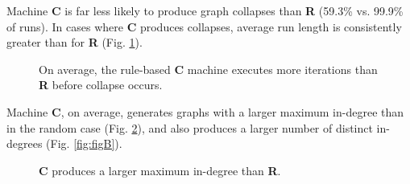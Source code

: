 \documentclass[twoside,twocolumn]{article}
\begin{document}
Machine \textbf{C} is far less likely to produce graph collapses than
\textbf{R} (59.3\% vs. 99.9\% of runs). In cases where \textbf{C} produces
collapses, average run length is consistently greater than
for \textbf{R} (Fig. \ref{fig:figA}).

\begin{figure}
  \caption{On average, the rule-based \textbf{C} machine executes more iterations than \textbf{R}  before collapse occurs.}
  \label{fig:figA}
\end{figure}

Machine \textbf{C}, on average, generates graphs with a larger 
maximum in-degree than in the random case (Fig. \ref{fig:figC}), and also produces a
larger number of distinct in-degrees (Fig. \ref{fig:figB}).

\begin{figure}
  \caption{\textbf{C} produces a larger maximum in-degree than \textbf{R}.}
  \label{fig:figC}
\end{figure}
\end{document}

